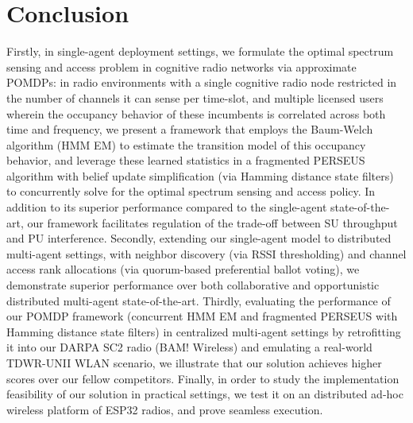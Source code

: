\documentclass[12pt, draftcls, onecolumn]{IEEEtran}
\begin{document}
\section{Conclusion}\label{V}
Firstly, in single-agent deployment settings, we formulate the optimal spectrum sensing and access problem in cognitive radio networks via approximate POMDPs: in radio environments with a single cognitive radio node restricted in the number of channels it can sense per time-slot, and multiple licensed users wherein the occupancy behavior of these incumbents is correlated across both time and frequency, we present a framework that employs the Baum-Welch algorithm (HMM EM) to estimate the transition model of this occupancy behavior, and leverage these learned statistics in a fragmented PERSEUS algorithm with belief update simplification (via Hamming distance state filters) to concurrently solve for the optimal spectrum sensing and access policy. In addition to its superior performance compared to the single-agent state-of-the-art, our framework facilitates regulation of the trade-off between SU throughput and PU interference. Secondly, extending our single-agent model to distributed multi-agent settings, with neighbor discovery (via RSSI thresholding) and channel access rank allocations (via quorum-based preferential ballot voting), we demonstrate superior performance over both collaborative and opportunistic distributed multi-agent state-of-the-art. Thirdly, evaluating the performance of our POMDP framework (concurrent HMM EM and fragmented PERSEUS with Hamming distance state filters) in centralized multi-agent settings by retrofitting it into our DARPA SC2 radio (BAM! Wireless) and emulating a real-world TDWR-UNII WLAN scenario, we illustrate that our solution achieves higher scores over our fellow competitors. Finally, in order to study the implementation feasibility of our solution in practical settings, we test it on an distributed ad-hoc wireless platform of ESP32 radios, and prove seamless execution.


\end{document}
